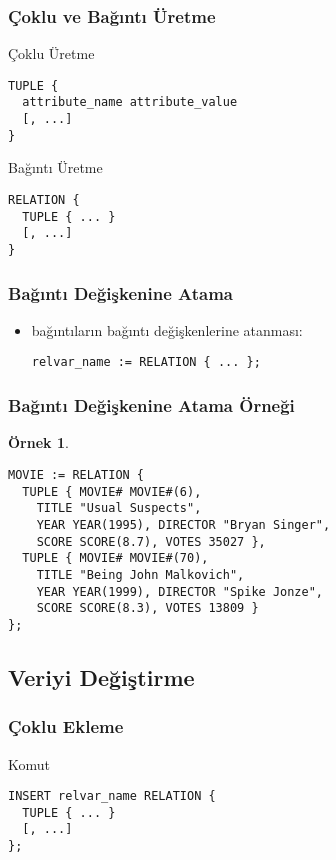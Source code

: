 \documentclass[dvipsnames]{beamer}
\theoremstyle{definition}
\theoremstyle{example}
\newtheorem{ornek}[theorem]{Örnek}
\theoremstyle{plain}
\begin{document}
\begin{frame}[fragile]
  \frametitle{Çoklu ve Bağıntı Üretme}

  \begin{block}{Çoklu Üretme}
    \begin{lstlisting}
TUPLE {
  attribute_name attribute_value
  [, ...]
}
    \end{lstlisting}
  \end{block}

  \pause
  \begin{block}{Bağıntı Üretme}
    \begin{lstlisting}
RELATION {
  TUPLE { ... }
  [, ...]
}
    \end{lstlisting}
  \end{block}
\end{frame}

\begin{frame}[fragile]
  \frametitle{Bağıntı Değişkenine Atama}

  \begin{itemize}
    \item bağıntıların bağıntı değişkenlerine atanması:
    \begin{lstlisting}
relvar_name := RELATION { ... };
    \end{lstlisting}
  \end{itemize}
\end{frame}

\begin{frame}[fragile]
  \frametitle{Bağıntı Değişkenine Atama Örneği}

  \begin{ornek}
    \begin{lstlisting}
MOVIE := RELATION {
  TUPLE { MOVIE# MOVIE#(6),
    TITLE "Usual Suspects",
    YEAR YEAR(1995), DIRECTOR "Bryan Singer",
    SCORE SCORE(8.7), VOTES 35027 },
  TUPLE { MOVIE# MOVIE#(70),
    TITLE "Being John Malkovich",
    YEAR YEAR(1999), DIRECTOR "Spike Jonze",
    SCORE SCORE(8.3), VOTES 13809 }
};
    \end{lstlisting}
  \end{ornek}
\end{frame}

\subsection{Veriyi Değiştirme}

\begin{frame}[fragile]
  \frametitle{Çoklu Ekleme}

  \begin{block}{Komut}
    \begin{lstlisting}
INSERT relvar_name RELATION {
  TUPLE { ... }
  [, ...]
};
    \end{lstlisting}
  \end{block}
\end{frame}
\end{document}
